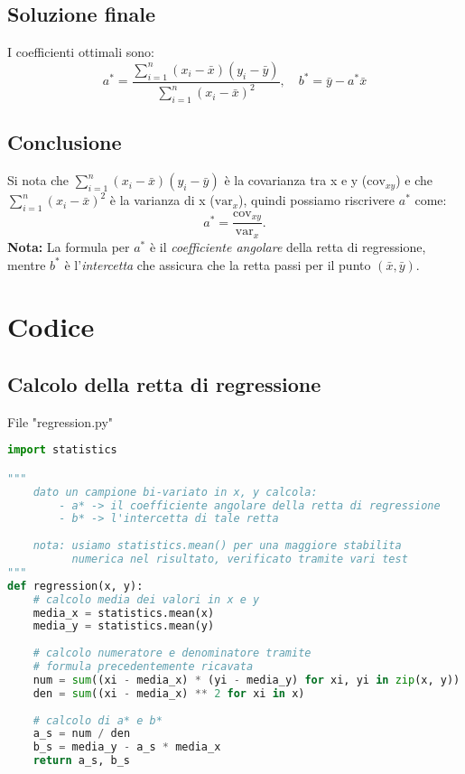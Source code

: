\documentclass[a4paper]{report}
\begin{document}
\subsection{Soluzione finale}

I coefficienti ottimali sono:
\[
\boxed{a^* = \frac{\sum_{i=1}^n (x_i - \bar{x})(y_i - \bar{y})}{\sum_{i=1}^n (x_i - \bar{x})^2}, \quad b^* = \bar{y} - a^* \bar{x}}
\]

\subsection{Conclusione}

Si nota che \(\sum_{i=1}^n (x_i - \bar{x})(y_i - \bar{y})\) è la covarianza tra x e y (\(\text{cov}_{xy}\)) e che \\
\(\sum_{i=1}^n (x_i - \bar{x})^2\) è la varianza di x (\(\text{var}_x\)), quindi possiamo riscrivere \(a^*\) come:
\[
a^* = \frac{\text{cov}_{xy}}{\text{var}_x}.
\]
\textbf{Nota:} La formula per \(a^*\) è il \textit{coefficiente angolare} della retta di regressione, mentre \(b^*\) è l'\textit{intercetta} che assicura che la retta passi per il punto \((\bar x, \bar y)\).

\newpage

\section{Codice}

\subsection{Calcolo della retta di regressione}

File "regression.py"
\begin{lstlisting}[language=Python]
import statistics

"""
    dato un campione bi-variato in x, y calcola:
        - a* -> il coefficiente angolare della retta di regressione
        - b* -> l'intercetta di tale retta
        
    nota: usiamo statistics.mean() per una maggiore stabilita
          numerica nel risultato, verificato tramite vari test
"""
def regression(x, y):
    # calcolo media dei valori in x e y
    media_x = statistics.mean(x)
    media_y = statistics.mean(y)
    
    # calcolo numeratore e denominatore tramite
    # formula precedentemente ricavata
    num = sum((xi - media_x) * (yi - media_y) for xi, yi in zip(x, y))
    den = sum((xi - media_x) ** 2 for xi in x)
    
    # calcolo di a* e b*
    a_s = num / den
    b_s = media_y - a_s * media_x
    return a_s, b_s

\end{lstlisting}
\end{document}
